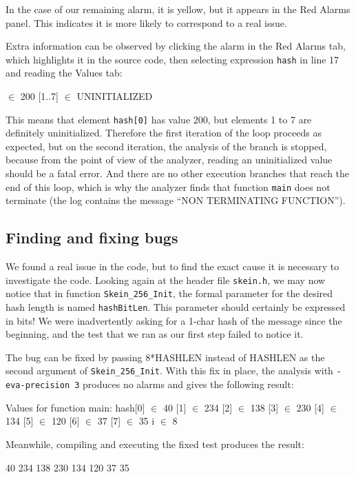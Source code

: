 \documentclass[web]{frama-c-book}
\begin{document}
In the case of our remaining alarm, it is yellow, but it appears in the
Red Alarms panel. This indicates it is more likely to correspond to a real
issue.

Extra information can be observed by clicking the alarm in the Red Alarms tab,
which highlights it in the source code, then selecting expression
\lstinline|hash| in line 17 and reading the \textsf{Values} tab:
\begin{logs}
  [0] $\in$ {200}
  [1..7] $\in$ UNINITIALIZED
\end{logs}
This means that element \lstinline|hash[0]| has value 200, but elements 1 to 7
are definitely uninitialized. Therefore the first iteration of the loop
proceeds as expected, but on the second iteration, the analysis of the branch
is stopped, because
from the point of view of the analyzer, reading an uninitialized
value should be a fatal error. And there are no other execution
branches that reach the end of this loop, which is why the analyzer
finds that function \lstinline|main| does not terminate (the log contains
the message ``NON TERMINATING FUNCTION'').

\subsection{Finding and fixing bugs}

We found a real issue in the code, but to find the exact cause it is necessary
to investigate the code.
Looking again at the header file \lstinline|skein.h|, we may now
notice that in function \lstinline|Skein_256_Init|,
the formal parameter for the desired hash length is named
\lstinline|hashBitLen|. This parameter should certainly be expressed in bits!
We were inadvertently asking for a 1-char hash of the message
since the beginning, and the test that we ran as our first
step failed to notice it.

The bug can be fixed by passing
8*HASHLEN instead of HASHLEN as the second argument of 
\lstinline|Skein_256_Init|.
With this fix in place, the analysis
with \lstinline|-eva-precision 3| produces no alarms and gives the following
result:
\begin{logs}
Values for function main:
  hash[0] $\in$ {40}
      [1] $\in$ {234}
      [2] $\in$ {138}
      [3] $\in$ {230}
      [4] $\in$ {134}
      [5] $\in$ {120}
      [6] $\in$ {37}
      [7] $\in$ {35}
  i $\in$ {8}
\end{logs}

Meanwhile, compiling and executing the fixed test produces the result:
\begin{logs}
40
234
138
230
134
120
37
35
\end{logs}
\end{document}
